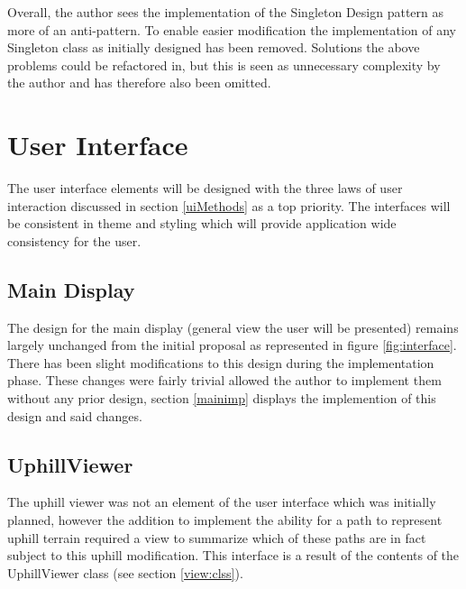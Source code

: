 Overall, the author sees the implementation of the Singleton Design pattern as more of an anti-pattern. To enable easier modification the implementation of any Singleton class as initially designed has been removed. Solutions the above problems could be refactored in, but this is seen as unnecessary complexity by the author and has therefore also been omitted.

\section{User Interface}
\label{interfacebrah}
The user interface elements will be designed with the three laws of user interaction discussed in section \ref{uiMethods} as a top priority. The interfaces will be consistent in theme and styling which will provide application wide consistency for the user.

\subsection{Main Display}

The design for the main display (general view the user will be presented) remains largely unchanged from the initial proposal as represented in figure \ref{fig:interface}. There has been slight modifications to this design during the implementation phase. These changes were fairly trivial allowed the author to implement them without any prior design, section \ref{mainimp} displays the implemention of this design and said changes.

\subsection{UphillViewer}
\label{uphillview}

The uphill viewer was not an element of the user interface which was initially planned, however the addition to implement the ability for a path to represent uphill terrain required a view to summarize which of these paths are in fact subject to this uphill modification. This interface is a result of the contents of the UphillViewer class (see section \ref{view:clss}).

